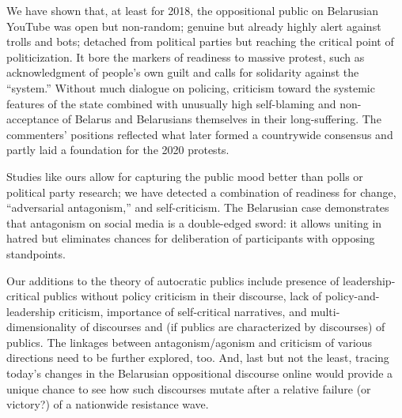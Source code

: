 We have shown that, at least for 2018, the oppositional public on Belarusian YouTube was open but non-random; genuine but already highly alert against trolls and bots; detached from political parties but reaching the critical point of politicization. It bore the markers of readiness to massive protest, such as acknowledgment of people’s own guilt and calls for solidarity against the “system.” Without much dialogue on policing, criticism toward the systemic features of the state combined with unusually high self-blaming and non-acceptance of Belarus and Belarusians themselves in their long-suffering. The commenters’ positions reflected what later formed a countrywide consensus and partly laid a foundation for the 2020 protests.

Studies like ours allow for capturing the public mood better than polls or political party research; we have detected a combination of readiness for change, “adversarial antagonism,” and self-criticism. The Belarusian case demonstrates that antagonism on social media is a double-edged sword: it allows uniting in hatred but eliminates chances for deliberation of participants with opposing standpoints.

Our additions to the theory of autocratic publics include presence of leadership-critical publics without policy criticism in their discourse, lack of policy-and-leadership criticism, importance of self-critical narratives, and multi-dimensionality of discourses and (if publics are characterized by discourses) of publics. The linkages between antagonism/agonism and criticism of various directions need to be further explored, too. And, last but not the least, tracing today’s changes in the Belarusian oppositional discourse online would provide a unique chance to see how such discourses mutate after a relative failure (or victory?) of a nationwide resistance wave.

\FloatBarrier
